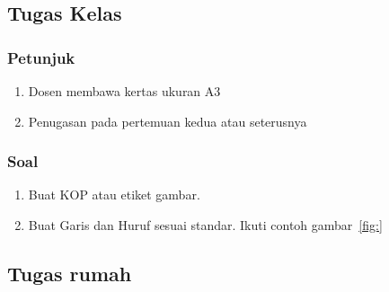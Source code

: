 \documentclass[../menggambarteknik.tex]{subfiles}
\begin{document}
\FloatBarrier

\subsection{Tugas Kelas}%
\label{sub:Tugas Kelas}

\subsubsection{Petunjuk}%
\label{ssub:Petunjuk}

\begin{enumerate}
	\item Dosen membawa kertas ukuran A3
	\item Penugasan pada pertemuan kedua atau seterusnya
\end{enumerate}

\subsubsection{Soal}%
\label{ssub:Soal}

\begin{enumerate}
	\item Buat KOP atau etiket gambar.
	\item Buat Garis dan Huruf sesuai standar. Ikuti contoh gambar~\ref{fig:}
\end{enumerate}


\subsection{Tugas rumah}%
\label{sub:Tugas rumah}
\end{document}
